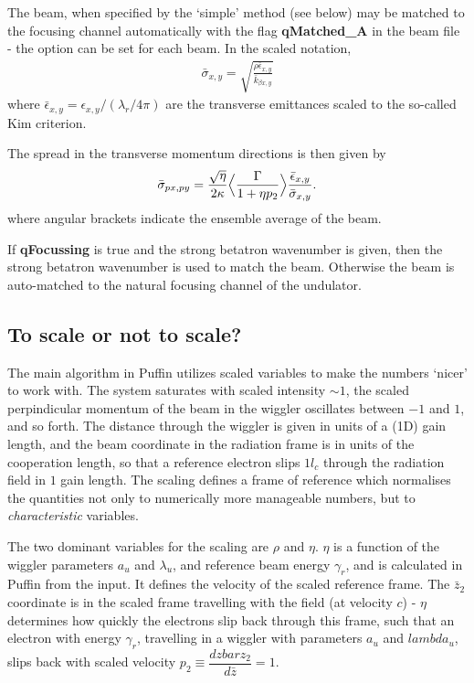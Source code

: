 \documentclass[12pt]{article}%
\begin{document}
The beam, when specified by the `simple' method (see below) may be matched to the focusing channel automatically with the flag {\bf qMatched\_A} in the beam file - the option can be set for each beam. In the scaled notation,
\begin{align}
\bar{\sigma}_{x,y} = \sqrt{  \frac{ \rho \bar{\epsilon}_{x,y} }{\bar{k}_{\beta x,y} }  }
\end{align}
where $\bar{\epsilon}_{x,y} = \epsilon_{x,y} / (\lambda_r / 4\pi)$ are the transverse emittances scaled to the so-called Kim criterion.



The spread in the transverse momentum directions is then given by 
\begin{align}
\bar{\sigma}_{px, py} = \frac{\sqrt{\eta}}{2 \kappa} \Bigl<  \frac{\Gamma}{1+\eta p_{2}}  \Bigr> \frac{ \bar{\epsilon}_{x,y} }{\bar{ \sigma}_{x,y}}.   \label{tmtch_spd} 
\end{align}
where angular brackets indicate the ensemble average of the beam.

If {\bf qFocussing} is true and the strong betatron wavenumber is given, then the strong betatron wavenumber is used to match the beam. Otherwise the beam is auto-matched to the natural focusing channel of the undulator. 




\subsection{To scale or not to scale?}

The main algorithm in Puffin utilizes scaled variables to make the numbers `nicer' to work with. The system saturates with scaled intensity $\sim 1$, the scaled perpindicular momentum of the beam in the wiggler oscillates between $-1$ and $1$, and so forth. The distance through the wiggler is given in units of a (1D) gain length, and the beam coordinate in the radiation frame is in units of the cooperation length, so that a reference electron slips $1l_c$ through the radiation field in $1$ gain  length. The scaling defines a frame of reference which normalises the quantities not only to numerically more manageable numbers, but to \textit{characteristic} variables. 

The two dominant variables for the scaling are $\rho$ and $\eta$. $\eta$ is a function of the wiggler parameters $a_u$ and $\lambda_u$, and reference beam energy $\gamma_r$, and is calculated in Puffin from the input. It defines the velocity of the scaled reference frame. The $\bar{z}_2$ coordinate is in the scaled frame travelling with the field (at velocity $c$) - $\eta$ determines how quickly the electrons slip back through this frame, such that an electron with energy $\gamma_r$, travelling in a wiggler with parameters $a_u$ and $lambda_u$, slips back with scaled velocity $p_2 \equiv \dfrac{d zbar{z}_2}{d\bar{z}} = 1$.
\end{document}

